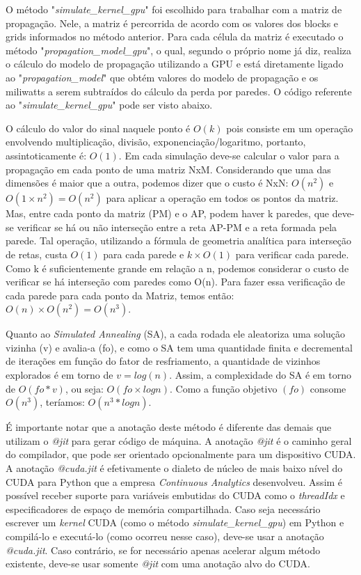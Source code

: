 \documentclass[
	12pt,				%
	openright,			%
	twoside,			%
	a4paper,			%
	english,			%
	french,				%
	spanish,			%
	brazil				%
	]{abntex2}
\begin{document}
O método "\textit{simulate\_kernel\_gpu}" foi  escolhido para trabalhar com a matriz de propagação. Nele, a matriz é percorrida de acordo com os valores dos blocks e grids informados no método anterior. Para cada célula da matriz é executado o método "\textit{propagation\_model\_gpu}", o qual, segundo o próprio nome já diz, realiza o cálculo do modelo de propagação utilizando a GPU e está diretamente ligado ao "\textit{propagation\_model}" que obtém valores do modelo de propagação e os miliwatts a serem subtraídos do cálculo da perda por paredes. O código referente ao "\textit{simulate\_kernel\_gpu}" pode ser visto abaixo.



O cálculo do valor do sinal naquele ponto é $ O(k) $ pois consiste em um operação envolvendo multiplicação, divisão, exponenciação/logaritmo, portanto, assintoticamente é: $ O(1) $. Em cada simulação deve-se calcular o valor para a propagação em cada ponto de uma matriz NxM. Considerando que uma das dimensões é maior que a outra, podemos dizer que o custo é NxN: $ O(n^{2}) $ e $ O(1\times n^{2}) = O(n^{2}) $ para aplicar a operação em todos os pontos da matriz. Mas, entre cada ponto da matriz (PM) e o AP, podem haver k paredes, que deve-se verificar se há ou não interseção entre a reta AP-PM e a reta formada pela parede. Tal operação, utilizando a fórmula de geometria analítica para interseção de retas, custa $ O(1) $ para cada parede e $ k\times O(1) $ para verificar cada parede. Como k é suficientemente grande em relação a n, podemos considerar o custo de verificar se há interseção com paredes como O(n). Para fazer essa verificação de cada parede para cada ponto da Matriz, temos então: $ O(n)\times O(n^{2}) = O(n^{3}) $.

Quanto ao \textit{Simulated Annealing} (SA), a cada rodada ele aleatoriza uma solução vizinha (v) e avalia-a (fo), e como o SA tem uma quantidade finita e decremental de iterações em função do fator de resfriamento, a quantidade de vizinhos explorados é em torno de $ v = log(n) $. Assim, a complexidade do SA é em torno de $ O(fo*v) $, ou seja: $ O(fo \times log n) $. Como a função objetivo $ (fo) $ consome $ O(n^{3}) $, teríamos: $ O(n^{3} * log n) $.

É importante notar que a anotação deste método é diferente das demais que utilizam o \textit{@jit} para gerar código de máquina. A anotação \textit{@jit} é o caminho geral do compilador, que pode ser orientado opcionalmente para um dispositivo CUDA. A anotação \textit{@cuda.jit} é efetivamente o dialeto de núcleo de mais baixo nível do CUDA para Python que a empresa \textit{Continuous Analytics} desenvolveu.  Assim é possível receber suporte para variáveis embutidas do CUDA como o \textit{threadIdx} e especificadores de espaço de memória compartilhada. Caso seja necessário escrever um \textit{kernel} CUDA (como o método \textit{simulate\_kernel\_gpu}) em Python e compilá-lo e executá-lo (como ocorreu nesse caso), deve-se usar a anotação \textit{@cuda.jit}. Caso contrário, se for necessário apenas acelerar algum método existente, deve-se usar somente \textit{@jit} com uma anotação alvo do CUDA.
\end{document}
